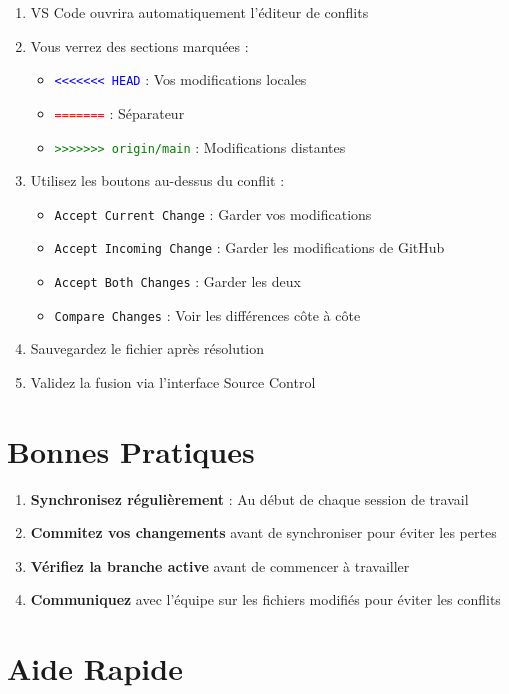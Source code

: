 \documentclass[a4paper,11pt]{article}
\begin{document}
\begin{enumerate}[leftmargin=2cm]
    \item VS Code ouvrira automatiquement l'éditeur de conflits
    \item Vous verrez des sections marquées :
    \begin{itemize}
        \item \textcolor{blue}{\texttt{<<<<<<< HEAD}} : Vos modifications locales
        \item \textcolor{red}{\texttt{=======}} : Séparateur
        \item \textcolor{green}{\texttt{>>>>>>> origin/main}} : Modifications distantes
    \end{itemize}
    \item Utilisez les boutons au-dessus du conflit :
    \begin{itemize}
        \item \texttt{Accept Current Change} : Garder vos modifications
        \item \texttt{Accept Incoming Change} : Garder les modifications de GitHub
        \item \texttt{Accept Both Changes} : Garder les deux
        \item \texttt{Compare Changes} : Voir les différences côte à côte
    \end{itemize}
    \item Sauvegardez le fichier après résolution
    \item Validez la fusion via l'interface Source Control
\end{enumerate}

\section{Bonnes Pratiques \faCheckDouble}

\begin{enumerate}
    \item \textbf{Synchronisez régulièrement} : Au début de chaque session de travail
    \item \textbf{Commitez vos changements} avant de synchroniser pour éviter les pertes
    \item \textbf{Vérifiez la branche active} avant de commencer à travailler
    \item \textbf{Communiquez} avec l'équipe sur les fichiers modifiés pour éviter les conflits
\end{enumerate}

\section{Aide Rapide \faQuestionCircle}
\end{document}
